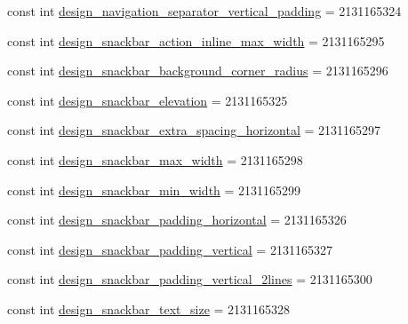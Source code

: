 \begin{DoxyCompactItemize}
\item 
const int \mbox{\hyperlink{class_f_w_p_s___app_1_1_droid_1_1_resource_1_1_dimension_a3af86466f230191f8c6040b7f98bc43c}{design\+\_\+navigation\+\_\+separator\+\_\+vertical\+\_\+padding}} = 2131165324
\item 
const int \mbox{\hyperlink{class_f_w_p_s___app_1_1_droid_1_1_resource_1_1_dimension_a642da59f155cba1f8f53165d85004c72}{design\+\_\+snackbar\+\_\+action\+\_\+inline\+\_\+max\+\_\+width}} = 2131165295
\item 
const int \mbox{\hyperlink{class_f_w_p_s___app_1_1_droid_1_1_resource_1_1_dimension_ad05e8b9ffc82543ae11af551ba2ee08d}{design\+\_\+snackbar\+\_\+background\+\_\+corner\+\_\+radius}} = 2131165296
\item 
const int \mbox{\hyperlink{class_f_w_p_s___app_1_1_droid_1_1_resource_1_1_dimension_aa239c6d2131d0dfa5165b5aba290a035}{design\+\_\+snackbar\+\_\+elevation}} = 2131165325
\item 
const int \mbox{\hyperlink{class_f_w_p_s___app_1_1_droid_1_1_resource_1_1_dimension_ab48698e1927ce6c7bc7e66eed30fd27b}{design\+\_\+snackbar\+\_\+extra\+\_\+spacing\+\_\+horizontal}} = 2131165297
\item 
const int \mbox{\hyperlink{class_f_w_p_s___app_1_1_droid_1_1_resource_1_1_dimension_a27e7e0afc5ed431732863a13485359c0}{design\+\_\+snackbar\+\_\+max\+\_\+width}} = 2131165298
\item 
const int \mbox{\hyperlink{class_f_w_p_s___app_1_1_droid_1_1_resource_1_1_dimension_aa62ff21731e0bffa03dd0a4804f01607}{design\+\_\+snackbar\+\_\+min\+\_\+width}} = 2131165299
\item 
const int \mbox{\hyperlink{class_f_w_p_s___app_1_1_droid_1_1_resource_1_1_dimension_a5d453c05e16a2396e3114bcd4388bc70}{design\+\_\+snackbar\+\_\+padding\+\_\+horizontal}} = 2131165326
\item 
const int \mbox{\hyperlink{class_f_w_p_s___app_1_1_droid_1_1_resource_1_1_dimension_ab8b465b07312a8fd3fb00ec4fc65085b}{design\+\_\+snackbar\+\_\+padding\+\_\+vertical}} = 2131165327
\item 
const int \mbox{\hyperlink{class_f_w_p_s___app_1_1_droid_1_1_resource_1_1_dimension_a85d99b1313e1c2d5f7d9cf82ab098873}{design\+\_\+snackbar\+\_\+padding\+\_\+vertical\+\_\+2lines}} = 2131165300
\item 
const int \mbox{\hyperlink{class_f_w_p_s___app_1_1_droid_1_1_resource_1_1_dimension_a64443be20a2bce88037d6abe336e1bbf}{design\+\_\+snackbar\+\_\+text\+\_\+size}} = 2131165328
\item 

\end{DoxyCompactItemize}
